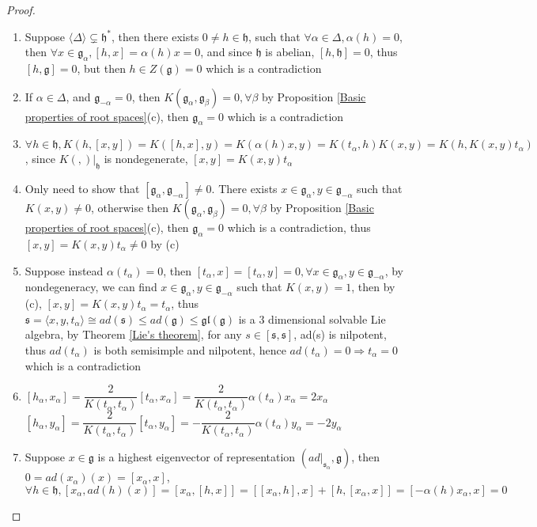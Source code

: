 \documentclass[main]{subfiles}
\begin{document}
\begin{proof} \hfill
\begin{enumerate}[leftmargin=*,label=\textit{(\alph*)}]
\item Suppose $\langle\Delta\rangle\subsetneq\mathfrak{h}^*$, then there exists $0\neq h\in\mathfrak{h}$, such that $\forall \alpha\in\Delta, \alpha(h)=0$, then $\forall x\in\mathfrak{g}_\alpha, [h,x]=\alpha(h)x=0$, and since $\mathfrak{h}$ is abelian, $[h,\mathfrak{h}]=0$, thus $[h,\mathfrak{g}]=0$, but then $h\in Z(\mathfrak{g})=0$ which is a contradiction
\item If $\alpha\in\Delta$, and $\mathfrak{g}_{-\alpha}=0$, then $K(\mathfrak{g}_\alpha,\mathfrak{g}_\beta)=0,\forall\beta$ by Proposition \ref{Basic properties of root spaces}(c), then $\mathfrak{g}_{\alpha}=0$ which is a contradiction
\item $\forall h\in\mathfrak{h}, K(h,[x,y])=K([h,x],y)=K(\alpha(h)x,y)=K(t_\alpha,h)K(x,y)=K(h,K(x,y)t_\alpha)$, since $K(,)|_{\mathfrak{h}}$ is nondegenerate, $[x,y]=K(x,y)t_\alpha$
\item Only need to show that $[\mathfrak{g}_{\alpha},\mathfrak{g}_{-\alpha}]\neq0$. There exists $x\in\mathfrak{g}_\alpha,y\in\mathfrak{g}_{-\alpha}$ such that $K(x,y)\neq0$, otherwise then $K(\mathfrak{g}_\alpha,\mathfrak{g}_\beta)=0,\forall\beta$ by Proposition \ref{Basic properties of root spaces}(c), then $\mathfrak{g}_{\alpha}=0$ which is a contradiction, thus $[x,y]=K(x,y)t_\alpha\neq0$ by (c)
\item Suppose instead $\alpha(t_\alpha)=0$, then $[t_\alpha,x]=[t_\alpha,y]=0,\forall x\in\mathfrak{g}_{\alpha},y\in\mathfrak{g}_{-\alpha}$, by nondegeneracy, we can find $x\in\mathfrak{g}_{\alpha},y\in\mathfrak{g}_{-\alpha}$ such that $K(x,y)=1$, then by (c), $[x,y]=K(x,y)t_\alpha=t_\alpha$, thus $\mathfrak{s}=\langle x,y,t_\alpha\rangle\cong ad(\mathfrak{s})\leq ad(\mathfrak{g})\leq \mathfrak{gl}(\mathfrak{g})$ is a $3$ dimensional solvable Lie algebra, by Theorem \ref{Lie's theorem}, for any $s\in[\mathfrak{s},\mathfrak{s}]$, ad(s) is nilpotent, thus $ad(t_\alpha)$ is both semisimple and nilpotent, hence $ad(t_\alpha)=0\Rightarrow t_\alpha=0$ which is a contradiction
\item $[h_\alpha,x_\alpha]=\dfrac{2}{K(t_\alpha,t_\alpha)}[t_\alpha,x_\alpha]=\dfrac{2}{K(t_\alpha,t_\alpha)}\alpha(t_\alpha)x_\alpha=2x_\alpha$
$[h_\alpha,y_\alpha]=\dfrac{2}{K(t_\alpha,t_\alpha)}[t_\alpha,y_\alpha]=-\dfrac{2}{K(t_\alpha,t_\alpha)}\alpha(t_\alpha)y_\alpha=-2y_\alpha$
\item Suppose $x\in\mathfrak{g}$ is a highest eigenvector of representation $(ad|_{\mathfrak{s}_\alpha},\mathfrak{g})$, then $0=ad(x_\alpha)(x)=[x_\alpha,x]$, $\forall h\in\mathfrak{h}, [x_\alpha,ad(h)(x)]=[x_\alpha,[h,x]]=[[x_\alpha,h],x]+[h,[x_\alpha,x]]=[-\alpha(h)x_\alpha,x]=0$
\end{enumerate}
\end{proof}
\end{document}
